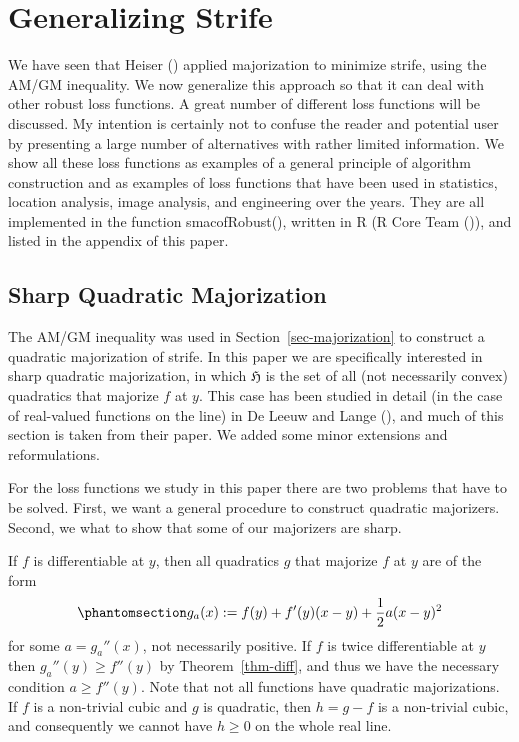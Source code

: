 \documentclass[
  12pt,
  letterpaper,
  DIV=11,
  numbers=noendperiod]{scrartcl}
\theoremstyle{definition}
\theoremstyle{plain}
\theoremstyle{plain}
\theoremstyle{plain}
\theoremstyle{definition}
\theoremstyle{remark}
\begin{document}
\section{Generalizing Strife}\label{generalizing-strife}

We have seen that Heiser () applied
majorization to minimize strife, using the AM/GM inequality. We now
generalize this approach so that it can deal with other robust loss
functions. A great number of different loss functions will be discussed.
My intention is certainly not to confuse the reader and potential user
by presenting a large number of alternatives with rather limited
information. We show all these loss functions as examples of a general
principle of algorithm construction and as examples of loss functions
that have been used in statistics, location analysis, image analysis,
and engineering over the years. They are all implemented in the function
smacofRobust(), written in R (R Core Team
()), and listed in the appendix of
this paper.

\subsection{Sharp Quadratic
Majorization}\label{sharp-quadratic-majorization}

The AM/GM inequality was used in Section~\ref{sec-majorization} to
construct a quadratic majorization of strife. In this paper we are
specifically interested in sharp quadratic majorization, in which
\(\mathfrak{H}\) is the set of all (not necessarily convex) quadratics
that majorize \(f\) at \(y\). This case has been studied in detail (in
the case of real-valued functions on the line) in De Leeuw and Lange
(), and much of this section is
taken from their paper. We added some minor extensions and
reformulations.

For the loss functions we study in this paper there are two problems
that have to be solved. First, we want a general procedure to construct
quadratic majorizers. Second, we what to show that some of our
majorizers are sharp.

If \(f\) is differentiable at \(y\), then all quadratics \(g\) that
majorize \(f\) at \(y\) are of the form
\begin{equation}\phantomsection\label{eq-qmaj}{
g_a(x):=f(y)+f'(y)(x-y)+\frac12a(x-y)^2
}\end{equation} for some \(a=g_a''(x)\), not necessarily positive. If
\(f\) is twice differentiable at \(y\) then \(g_a''(y)\geq f''(y)\) by
Theorem~\ref{thm-diff}, and thus we have the necessary condition
\(a\geq f''(y)\). Note that not all functions have quadratic
majorizations. If \(f\) is a non-trivial cubic and \(g\) is quadratic,
then \(h=g-f\) is a non-trivial cubic, and consequently we cannot have
\(h\geq 0\) on the whole real line.
\end{document}
